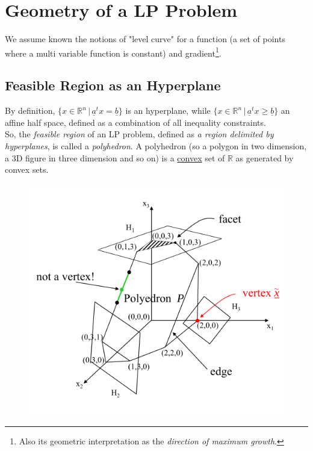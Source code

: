     \section{Geometry of a LP Problem}
        We assume known the notions of "level curve" for a function (a set of points where a multi variable function is constant) and gradient\footnote{Also its geometric interpretation as the \textit{direction of maximum growth}.}.

        \subsection{Feasible Region as an Hyperplane}
            By definition, $\{x \in \mathbb{R}^n \,\vert\, \underline{a}^tx = \underline{b}\}$ is an hyperplane, while $\{x \in \mathbb{R}^n \,\vert\, \underline{a}^tx \geq \underline{b}\}$ an affine half space, defined as a combination of all inequality constraints.\\
            So, the \textit{feasible region} of an LP problem, defined as \textit{a region delimited by hyperplanes}, is called a \textit{polyhedron}. A polyhedron (so a polygon in two dimension, a 3D figure in three dimension and so on) is a \underline{convex} set of $\mathbb{R}$ as generated by convex sets.
            \begin{figure}[H]
                \centering
                \includegraphics{./images/Polyhedron1.png} %
            \end{figure}
